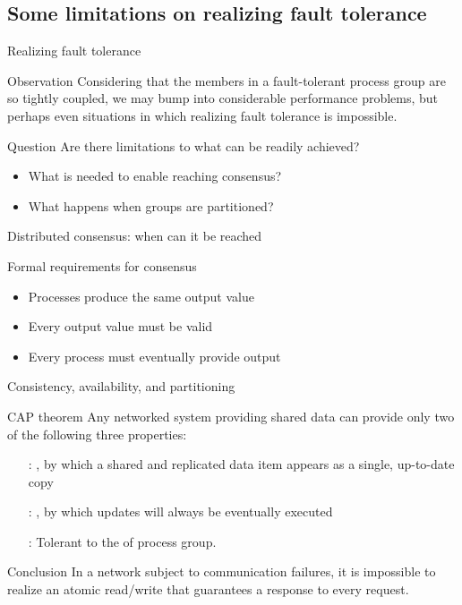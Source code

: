 \subsection{Some limitations on realizing fault tolerance}
\begin{slide}{Realizing fault tolerance}
  \begin{block}{Observation}
    Considering that the members in a fault-tolerant process group are so tightly coupled, we may bump into
    considerable performance problems, but perhaps even situations in which realizing fault tolerance is
    impossible. 
  \end{block}
  \begin{block}{Question}
    Are there limitations to what can be readily achieved?
    \begin{itemize}
    \item What is needed to enable reaching consensus?
    \item What happens when groups are partitioned?
    \end{itemize}
  \end{block}
\end{slide}
\begin{slide}{Distributed consensus: when can it be reached}
  \begin{centerfig}
  \end{centerfig}
  \begin{block}{Formal requirements for consensus}
    \begin{itemize}\tightlist
    \item Processes produce the same output value
    \item Every output value must be valid  
    \item Every process must eventually provide output
    \end{itemize}
  \end{block}
\end{slide}
\begin{slide}{Consistency, availability, and partitioning}
  \begin{block}{CAP theorem}
    Any networked system providing shared data can provide only two of the following three
    properties:
    \begin{itemize}
    \item[\red{C}:] , by which a shared and replicated data item appears as a single,
      up-to-date copy
    \item[\red{A}:] , by which updates will always be eventually executed
    \item[\red{P}:] Tolerant to the  of process group.
    \end{itemize}
  \end{block}
  \begin{alertblock}{Conclusion}
    In a network subject to communication failures, it is impossible to realize an atomic read/write
     that guarantees a response to every request.
  \end{alertblock}
\end{slide}
